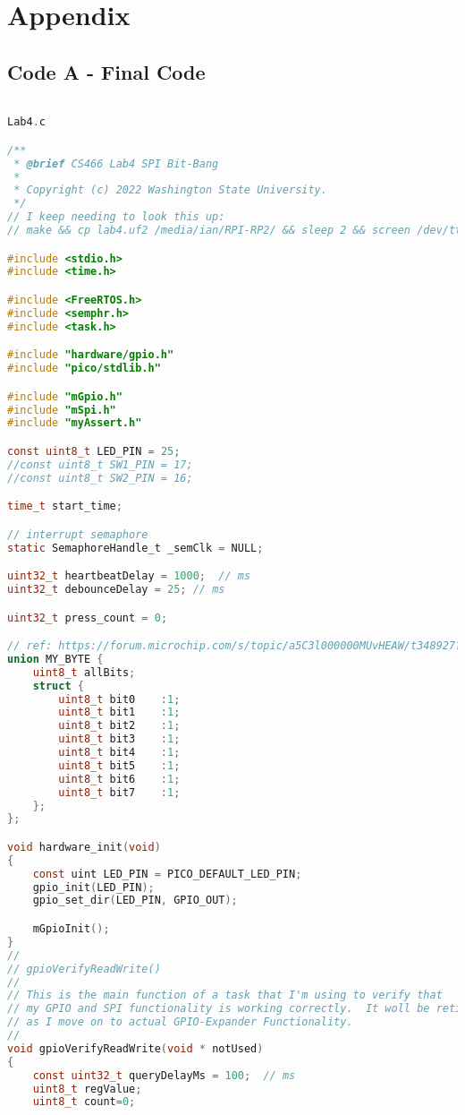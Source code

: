 \documentclass[sigconf]{article}
\begin{document}
\clearpage
\section*{Appendix}
\subsection*{Code A - Final Code}

\begin{lstlisting}[basicstyle=\footnotesize\ttfamily, language=c,breaklines]

Lab4.c

/**
 * @brief CS466 Lab4 SPI Bit-Bang
 * 
 * Copyright (c) 2022 Washington State University.
 */
// I keep needing to look this up:
// make && cp lab4.uf2 /media/ian/RPI-RP2/ && sleep 2 && screen /dev/ttyACM0

#include <stdio.h>
#include <time.h>

#include <FreeRTOS.h>
#include <semphr.h>
#include <task.h>

#include "hardware/gpio.h"
#include "pico/stdlib.h"

#include "mGpio.h"
#include "mSpi.h"
#include "myAssert.h"

const uint8_t LED_PIN = 25;
//const uint8_t SW1_PIN = 17;
//const uint8_t SW2_PIN = 16;

time_t start_time;

// interrupt semaphore
static SemaphoreHandle_t _semClk = NULL;

uint32_t heartbeatDelay = 1000;  // ms
uint32_t debounceDelay = 25; // ms

uint32_t press_count = 0;

// ref: https://forum.microchip.com/s/topic/a5C3l000000MUvHEAW/t348927?comment=P-2709830
union MY_BYTE {
    uint8_t allBits;
    struct {
        uint8_t bit0    :1;
        uint8_t bit1    :1;
        uint8_t bit2    :1;
        uint8_t bit3    :1;
        uint8_t bit4    :1;
        uint8_t bit5    :1;
        uint8_t bit6    :1;
        uint8_t bit7    :1;
    };
};

void hardware_init(void)
{
    const uint LED_PIN = PICO_DEFAULT_LED_PIN;
    gpio_init(LED_PIN);
    gpio_set_dir(LED_PIN, GPIO_OUT);

    mGpioInit();
}
//
// gpioVerifyReadWrite()
//
// This is the main function of a task that I'm using to verify that 
// my GPIO and SPI functionality is working correctly.  It woll be retired 
// as I move on to actual GPIO-Expander Functionality.
//
void gpioVerifyReadWrite(void * notUsed)
{   
    const uint32_t queryDelayMs = 100;  // ms
    uint8_t regValue;
    uint8_t count=0;


\end{lstlisting}
\end{document}
